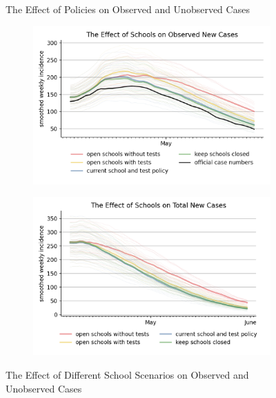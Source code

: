 \begin{figure}[ht]
\begin{subfigure}{.6\textwidth}
\end{subfigure}
\caption{The Effect of Policies on Observed and Unobserved Cases}
\label{fig:explain_decline}
\figurenotes{\textcolor{red}{\ldots}}
\end{figure}





\begin{figure}[ht]
\centering
\begin{subfigure}{.6\textwidth}
  \includegraphics[width=0.9 \textwidth]{../figures/results/figures/comparisons/school_scenarios/full_new_known_case}
\end{subfigure}%
\begin{subfigure}{.6\textwidth}
  \includegraphics[width=0.9 \textwidth]{../figures/results/figures/comparisons/school_scenarios/full_newly_infected}
\end{subfigure}
\caption{The Effect of Different School Scenarios on Observed and Unobserved Cases}
\figurenotes{\textcolor{red}{\ldots}}
\label{fig:school_scenarios}
\end{figure}


\FloatBarrier


